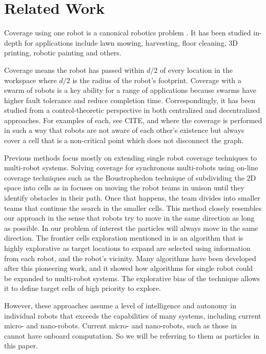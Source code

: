 
\section{Related Work}\label{sec:RelatedWork}

Coverage using one robot is a canonical robotics problem \cite{choset2001coverage}. It has been studied in-depth for applications include lawn mowing, harvesting, floor cleaning, 3D printing, robotic painting and others. 

Coverage means the robot has passed within $d/2$ of every location in the workspace where $d/2$ is the radius of the robot's footprint. Coverage with a swarm of robots is a key ability for a range of applications because swarms have higher fault tolerance and reduce completion time. Correspondingly, it has been studied from a control-theoretic perspective in  both centralized and decentralized approaches. For examples of each, see  CITE, and \cite{wagner1999distributed} where the coverage is performed in such a way that robots are not aware of each other's existence but always cover a cell that is a non-critical point which does not disconnect the graph. 

Previous methods focus mostly on extending  single robot coverage techniques to multi-robot systems. Solving coverage for synchronous multi-robots using on-line coverage techniques such as the Boustrophedon technique of subdividing the 2D space into cells as in \cite{latimer2002towards} focuses on moving the robot teams in unison until they identify obstacles in their path. Once that happens, the team divides into smaller teams that continue the search in the smaller cells. This method closely resembles our approach in the sense that robots try to move in the same direction as long as possible. In our problem of interest the particles will always move in the same direction.  
The frontier cells exploration mentioned in \cite{yamauchi1998frontier} is an algorithm that is highly explorative as target locations to expand are selected using information from each robot, and the robot's vicinity. Many algorithms have been developed after this pioneering work, and it showed how algorithms for single robot could be expanded to multi-robot systems. The explorative bias of the technique allows it to define target cells of high priority to explore.   


However, these approaches assume a level of intelligence and autonomy in individual robots that exceeds the capabilities of many systems, including current micro- and nano-robots.  Current micro- and nano-robots, such as those in~\cite{Chowdhury2015,martel2015magnetotactic,Xiaohui2015magnetiteMicroswimmers} cannot have onboard computation. So we will be referring to them as particles in this paper.


